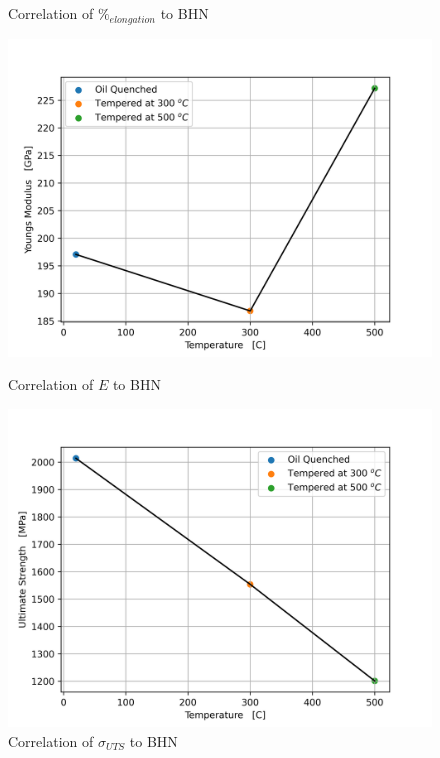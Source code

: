 \documentclass{article}
\begin{document}
\begin{figure}[!h!]
\begin{minipage}[b]{.5\linewidth}
    \caption{Correlation of $\%_{elongation}$ to BHN}
    \label{fig:q6-perelong}
    \vspace{4ex}
\end{minipage}
\begin{minipage}[b]{.5\linewidth}
    \includegraphics[width=\linewidth]{plots/q6_youngs.png}
    \caption{Correlation of $E$ to BHN}
    \label{fig:q6-youngs}
    \vspace{4ex}
\end{minipage}
\begin{minipage}[b]{.5\linewidth}
    \includegraphics[width=\linewidth]{plots/q6_uts.png}
    \caption{Correlation of $\sigma_{UTS}$ to BHN}
    \label{fig:q6-uts}
    \vspace{4ex}
\end{minipage}
\end{figure}
\newpage
\end{document}
